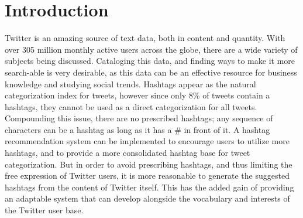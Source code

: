 \documentclass{acm_proc_article-sp}
\begin{document}
\section{Introduction}
\hspace*{5mm}Twitter is an amazing source of text data, both in content and quantity. With over 305 million monthly active users across the globe, there are a wide variety of subjects being discussed. Cataloging this data, and finding ways to make it more search-able is very desirable, as this data can be an effective resource for business knowledge and studying social trends. Hashtags appear as the natural categorization index for tweets, however since only 8\% of tweets contain a hashtags, they cannot be used as a direct categorization for all tweets. Compounding this issue, there are no prescribed hashtags; any sequence of characters can be a hashtag as long as it has a \# in front of it. A hashtag recommendation system can be implemented to encourage users to utilize more hashtags, and to provide a more consolidated hashtag base for tweet categorization. But in order to avoid prescribing hashtags, and thus limiting the free expression of Twitter users, it is more reasonable to generate the suggested hashtags from the content of Twitter itself. This has the added gain of providing an adaptable system that can develop alongside the vocabulary and interests of the Twitter user base.
\end{document}
